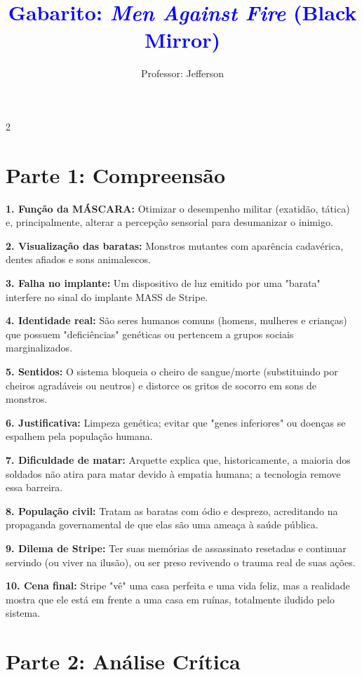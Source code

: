 \documentclass[11pt]{article}
\title{\textcolor{blue}{Gabarito: \textit{Men Against Fire} (Black Mirror)}}
\author{Professor: Jefferson}
\date{}
\begin{document}
\maketitle
\vspace{-1cm}

\begin{multicols}{2}

\section*{Parte 1: Compreensão}

\textbf{1. Função da MÁSCARA:} Otimizar o desempenho militar (exatidão, tática) e, principalmente, alterar a percepção sensorial para desumanizar o inimigo.

\textbf{2. Visualização das baratas:} Monstros mutantes com aparência cadavérica, dentes afiados e sons animalescos.

\textbf{3. Falha no implante:} Um dispositivo de luz emitido por uma "barata" interfere no sinal do implante MASS de Stripe.

\textbf{4. Identidade real:} São seres humanos comuns (homens, mulheres e crianças) que possuem "deficiências" genéticas ou pertencem a grupos sociais marginalizados.

\textbf{5. Sentidos:} O sistema bloqueia o cheiro de sangue/morte (substituindo por cheiros agradáveis ou neutros) e distorce os gritos de socorro em sons de monstros.

\textbf{6. Justificativa:} Limpeza genética; evitar que "genes inferiores" ou doenças se espalhem pela população humana.

\textbf{7. Dificuldade de matar:} Arquette explica que, historicamente, a maioria dos soldados não atira para matar devido à empatia humana; a tecnologia remove essa barreira.

\textbf{8. População civil:} Tratam as baratas com ódio e desprezo, acreditando na propaganda governamental de que elas são uma ameaça à saúde pública.

\textbf{9. Dilema de Stripe:} Ter suas memórias de assassinato resetadas e continuar servindo (ou viver na ilusão), ou ser preso revivendo o trauma real de suas ações.

\textbf{10. Cena final:} Stripe "vê" uma casa perfeita e uma vida feliz, mas a realidade mostra que ele está em frente a uma casa em ruínas, totalmente iludido pelo sistema.

\section*{Parte 2: Análise Crítica}


\end{multicols}
\end{document}

